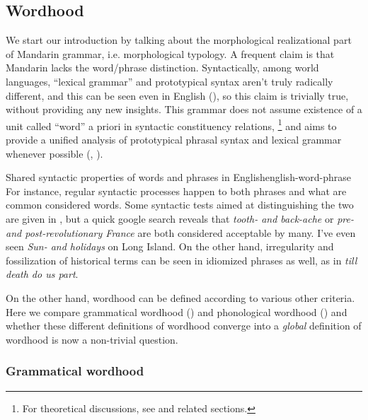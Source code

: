 \documentclass[UTF8, a4paper, oneside, scheme=plain, 12pt]{ctexrep}
\newcommand*{\citepages}[1]{pp.~{#1}}
\newcommand{\form}[1]{\emph{#1}}
\begin{document}
\subsection{Wordhood}\label{sec:grammatical.wordhood}

We start our introduction by talking about the morphological realizational part of Mandarin grammar,
i.e. morphological typology.
A frequent claim is that Mandarin lacks the word/phrase distinction.
Syntactically, among world languages,
``lexical grammar'' and prototypical syntax aren't truly radically different,
and this can be seen even in English (),
so this claim is trivially true, without providing any new insights.
This grammar does not assume existence of a unit called ``word'' a priori in syntactic constituency relations,%
\footnote{
    For theoretical discussions, see  and related sections.
}
and aims to provide a unified analysis of prototypical phrasal syntax
and lexical grammar whenever possible
(, ).

\begin{theorybox}{Shared syntactic properties of words and phrases in English}{english-word-phrase}
    For instance, regular syntactic processes happen to both phrases and what are common considered words.
    Some syntactic tests aimed at distinguishing the two are given in \citet[\citepages{448-451}]{cgel},
    but a quick google search reveals that \form{tooth- and back-ache}
    or \form{pre- and post-revolutionary France} are both considered acceptable by many.
    I've even seen \form{Sun- and holidays} on Long Island.
    On the other hand, irregularity and fossilization of historical terms
    can be seen in idiomized phrases as well, as in \form{till death do us part}.
\end{theorybox}

On the other hand, wordhood can be defined according to various other criteria.
Here we compare grammatical wordhood () 
and phonological wordhood ()
and whether these different definitions of wordhood converge into a \emph{global} definition of wordhood
is now a non-trivial question.

\subsubsection{Grammatical wordhood}\label{sec:grammatical.wordhood.grammatical-word}
\end{document}
